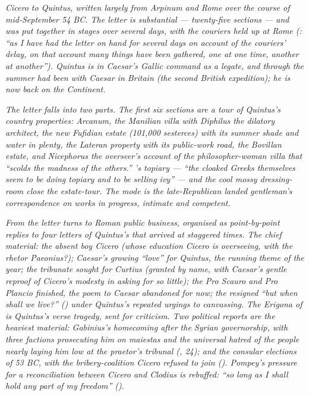 
\textit{Cicero to Quintus, written largely from Arpinum and
Rome over the course of mid-September 54 BC. The letter is
substantial --- twenty-five sections --- and was put together
in stages over several days, with the couriers held up at
Rome (: ``as I have had the letter on hand for
several days on account of the couriers' delay, on that
account many things have been gathered, one at one time,
another at another''). Quintus is in Caesar's Gallic command
as a legate, and through the summer had been with Caesar in
Britain (the second British expedition); he is now back on
the Continent.}

\textit{The letter falls into two parts. The first six
sections are a tour of Quintus's country properties: Arcanum,
the Manilian villa with Diphilus the dilatory architect, the
new Fufidian estate (101,000 sesterces) with its summer shade
and water in plenty, the Lateran property with its public-work
road, the Bovillan estate, and Nicephorus the overseer's
account of the philosopher-woman villa that ``scolds the
madness of the others.'' 's topiary --- ``the
cloaked Greeks themselves seem to be doing topiary and to be
selling ivy'' --- and the cool mossy dressing-room close the
estate-tour. The mode is the late-Republican landed gentleman's
correspondence on works in progress, intimate and competent.}

\textit{From  the letter turns to Roman public
business, organised as point-by-point replies to four letters
of Quintus's that arrived at staggered times. The chief
material: the absent boy Cicero (whose education Cicero is
overseeing, with the rhetor Paeonius?); Caesar's growing
``love'' for Quintus, the running theme of the year; the
tribunate sought for Curtius (granted by name, with Caesar's
gentle reproof of Cicero's modesty in asking for so little);
the Pro Scauro and Pro Plancio finished, the poem to Caesar
abandoned for now; the resigned ``but when shall we live?''
() under Quintus's repeated urgings to
canvassing. The Erigona of  is Quintus's verse
tragedy, sent for criticism. Two political reports are the
heaviest material: Gabinius's homecoming after the Syrian
governorship, with three factions prosecuting him on
\textit{maiestas} and the universal hatred of the people
nearly laying him low at the praetor's tribunal
(\textsection{}, 24); and the consular elections
of 53 BC, with the bribery-coalition Cicero refused to join
(). Pompey's pressure for a reconciliation
between Cicero and Clodius is rebuffed: ``so long as I shall
hold any part of my freedom'' ().}

